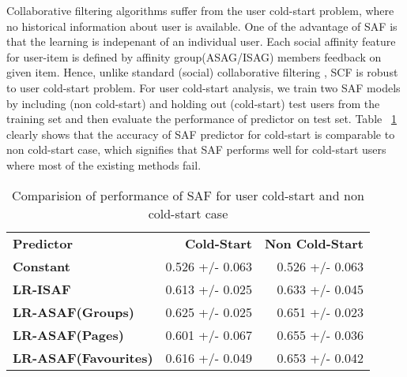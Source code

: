 Collaborative filtering algorithms suffer from the user cold-start problem,
where no historical information about user is available. One of the advantage of SAF is that 
the learning is indepenant of an individual user. Each social affinity feature for user-item is
defined by affinity group(ASAG/ISAG) members feedback on given item. 
Hence, unlike standard (social) collaborative filtering , SCF is robust to user 
cold-start problem.  For user cold-start analysis, we train two SAF models by 
including (non cold-start) and holding out (cold-start) test users from the 
training set and then evaluate the performance of predictor on test set. 
Table ~\ref{tab:coldstart} clearly shows that the accuracy of  SAF predictor for 
cold-start is comparable to non cold-start case, which signifies that SAF
performs well for cold-start users where most of the existing methods fail.

\begin{table}[t!]
\centering
\begin{tabular}{|>{\small}l|>{\small}r|>{\small}r|}
\hline
& \multicolumn{2}{|c|}{\textbf{Accuracy}}\\
\hline
\textbf{Predictor}& \textbf{Cold-Start} & \textbf{Non Cold-Start}\\
\hline
\textbf{Constant} & 0.526  +/-  0.063 & 0.526  +/-  0.063 \\
\hline
\textbf{LR-ISAF} & 0.613 +/- 0.025 & 0.633  +/-  0.045 \\
\hline
\textbf{LR-ASAF(Groups)} & 0.625  +/-  0.025 & 0.651  +/-  0.023 \\
\hline
\textbf{LR-ASAF(Pages)} & 0.601  +/-  0.067 & 0.655  +/-  0.036 \\
\hline
\textbf{LR-ASAF(Favourites)} & 0.616  +/-  0.049 & 0.653  +/-  0.042\\
\hline
\end{tabular}
\caption{Comparision of performance of SAF for user cold-start and non cold-start case}
\label{tab:coldstart}
\end{table}